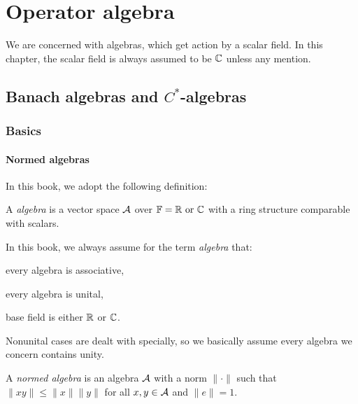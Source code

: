 \documentclass{../crs}
\begin{document}
\chapter{Operator algebra}
We are concerned with algebras, which get action by a scalar field.
In this chapter, the scalar field is always assumed to be $\mathbb{C}$ unless any mention.

\section{Banach algebras and $C^*$-algebras}

\subsection{Basics}

\subsubsection{Normed algebras}
In this book, we adopt the following definition:
\begin{defn}
A \emph{algebra} is a vector space $\mathcal{A}$ over $\mathbb{F}=\mathbb{R}\text{ or }\mathbb{C}$ with a ring structure comparable with scalars.
\end{defn}
In this book, we always assume for the term \emph{algebra} that:
\begin{cond}
\item every algebra is associative,
\item every algebra is unital,
\item base field is either $\mathbb{R}$ or $\mathbb{C}$.
\end{cond}
Nonunital cases are dealt with specially, so we basically assume every algebra we concern contains unity.




\begin{defn}
A \emph{normed algebra} is an algebra $\mathcal{A}$ with a norm $\|\cdot\|$ such that $\|xy\|\le\|x\|\|y\|$ for all $x,y\in\mathcal{A}$ and $\|e\|=1$.
\end{defn}
\end{document}
